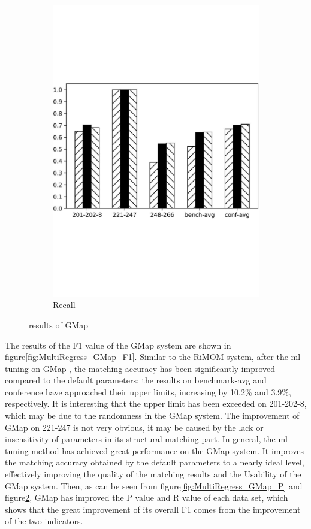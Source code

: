 \documentclass[twoside]{article}
\begin{document}
\begin{figure}[htb!]
\begin{subfigure}{0.3\textwidth}
\includegraphics[width=\textwidth]{data_figs/MulRegress_GMap_R.pdf}
\caption{Recall}
\label{fig:MultiRegress_GMap_R}
\end{subfigure}
\caption{results of GMap}
\end{figure}

The results of the F1 value of the GMap system are shown in figure\ref{fig:MultiRegress_GMap_F1}.
Similar to the RiMOM system, after the ml tuning on GMap , the matching accuracy has been significantly improved compared to the default parameters: the results on benchmark-avg and conference have approached their upper limits, increasing by 10.2\% and 3.9\%, respectively.
It is interesting that the upper limit has been exceeded on 201-202-8, which may be due to the randomness in the GMap system.
The improvement of GMap on 221-247 is not very obvious, it may be caused by the lack or insensitivity of parameters in its structural matching part.
In general, the ml tuning method has achieved great performance on the GMap system. It improves the matching accuracy obtained by the default parameters to a nearly ideal level, effectively improving the quality of the matching results and the Usability of the GMap system.
Then, as can be seen from figure\ref{fig:MultiRegress_GMap_P} and figure\ref{fig:MultiRegress_GMap_R}, GMap has improved the P value and R value of each data set, which shows that the great improvement of its overall F1 comes from the improvement of the two indicators.
\end{document}
